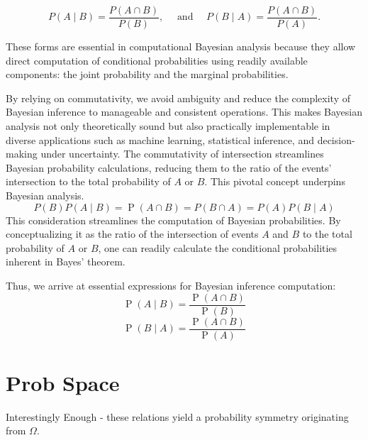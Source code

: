 \documentclass[
  12 pt,
  a4paper,
]{book}
\numberwithin{equation}{section}
\theoremstyle{plain}      %
\theoremstyle{definition} %
\theoremstyle{remark}     %
\theoremstyle{note}         %
\begin{document}
\[
P(A \mid B)=\frac{P(A \cap B)}{P(B)}, \quad \text { and } \quad P(B \mid A)=\frac{P(A \cap B)}{P(A)} .
\]

These forms are essential in computational Bayesian analysis because
they allow direct computation of conditional probabilities using readily
available components: the joint probability and the marginal
probabilities.

By relying on commutativity, we avoid ambiguity and reduce the
complexity of Bayesian inference to manageable and consistent
operations. This makes Bayesian analysis not only theoretically sound
but also practically implementable in diverse applications such as
machine learning, statistical inference, and decision-making under
uncertainty. The commutativity of intersection streamlines Bayesian
probability calculations, reducing them to the ratio of the events'
intersection to the total probability of \(A\) or \(B\). This pivotal
concept underpins Bayesian analysis. \[
P(B) P(A \mid B)=\operatorname{P}(A \cap B)=P(B \cap A)=P(A) P(B \mid A)
\] This consideration streamlines the computation of Bayesian
probabilities. By conceptualizing it as the ratio of the intersection of
events \(A\) and \(B\) to the total probability of \(A\) or \(B\), one
can readily calculate the conditional probabilities inherent in Bayes'
theorem.

Thus, we arrive at essential expressions for Bayesian inference
computation: \[
\operatorname{P}(A\! \mid\! B)=\frac{\operatorname{P}(A \cap B)}{\operatorname{P}(B)}
\] \[
\operatorname{P}(B\! \mid\! A)=\frac{\operatorname{P}(A \cap B)}{\operatorname{P}(A)}
\]

\newpage

\hypertarget{prob-space}{%
\section{Prob Space}\label{prob-space}}

Interestingly Enough - these relations yield a probability symmetry
originating from \(\Omega\).
\end{document}
